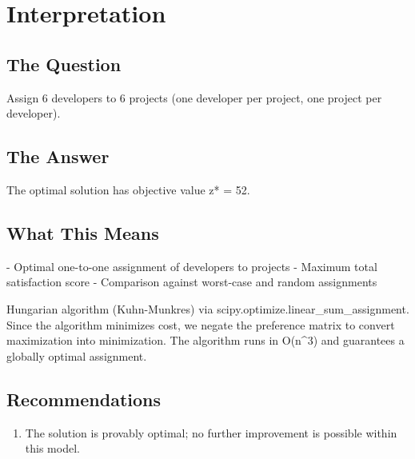 \documentclass[11pt, a4paper]{article}
\begin{document}
\section{Interpretation}

\subsection{The Question}
Assign 6 developers to 6 projects (one developer per project, one project per developer).

\subsection{The Answer}

\begin{polyainsight}[title={Bottom Line}]
The optimal solution has objective value z* = 52.
\end{polyainsight}

\subsection{What This Means}

- Optimal one-to-one assignment of developers to projects
- Maximum total satisfaction score
- Comparison against worst-case and random assignments

Hungarian algorithm (Kuhn-Munkres) via scipy.optimize.linear\_sum\_assignment. Since the algorithm minimizes cost, we negate the preference matrix to convert maximization into minimization. The algorithm runs in O(n\textasciicircum{}3) and guarantees a globally optimal assignment.



\subsection{Recommendations}

\begin{enumerate}
  \item The solution is provably optimal; no further improvement is possible within this model.
\end{enumerate}
\end{document}
